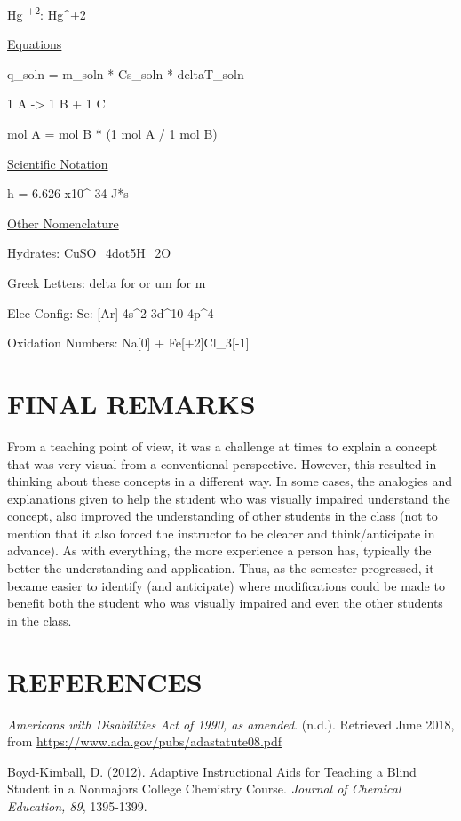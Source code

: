 \documentclass[11.5pt]{sig-alternate} %
\begin{document}
\begin{large}
Hg \textsuperscript{+2}:  Hg\^{}+2

\underline{Equations}

q\_soln = m\_soln * Cs\_soln * deltaT\_soln

1 A -> 1 B + 1 C

mol A = mol B * (1 mol A / 1 mol B)

\underline{Scientific Notation}

h = 6.626 x10\^{}-34 J*s

\underline{Other Nomenclature}

Hydrates: CuSO\_4dot5H\_2O

Greek Letters: delta for \textDelta or um for \textmu m

Elec Config: Se: [Ar] 4s\^{}2 3d\^{}10 4p\^{}4

Oxidation Numbers: Na[0] + Fe[+2]Cl\_3[-1]

  
\section*{FINAL REMARKS}

From a teaching point of view, it was a challenge at times to explain a concept that was very visual from a conventional perspective.  However, this resulted in thinking about these concepts in a different way.  In some cases, the analogies and explanations given to help the student who was visually impaired understand the concept, also improved the understanding of other students in the class (not to mention that it also forced the instructor to be clearer and think/anticipate in advance).  As with everything, the more experience a person has, typically the better the understanding and application.  Thus, as the semester progressed, it became easier to identify (and anticipate) where modifications could be made to benefit both the student who was visually impaired and even the other students in the class.

\end{large}
 
\section*{REFERENCES}\par 

\leftskip 0.25in
\parindent -0.25in 

\textit{Americans with Disabilities Act of 1990, as amended}. (n.d.). Retrieved June 2018, from \url{https://www.ada.gov/pubs/adastatute08.pdf}

Boyd-Kimball, D. (2012). Adaptive Instructional Aids for Teaching a Blind Student in a Nonmajors College Chemistry Course. \textit{Journal of Chemical Education, 89}, 1395-1399.
\end{document}
